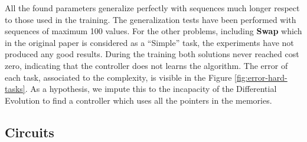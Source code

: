 All the found parameters generalize perfectly with sequences much longer respect to those used in the training. The generalization tests have been performed with sequences of maximum 100 values. For the other problems, including \textbf{Swap} which in the original paper is considered as a ``Simple'' task, the experiments have not produced any good results. During the training both solutions never reached cost zero, indicating that the controller does not learns the algorithm. The error of each task, associated to the complexity, is visible in the Figure \ref{fig:error-hard-tasks}. As a hypothesis, we impute this to the incapacity of the Differential Evolution to find a controller which uses all the pointers in the memories.

\subsection{Circuits}\label{subsec:circuits}